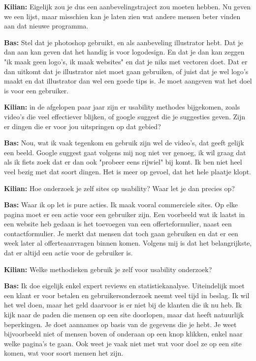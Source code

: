 \textbf{Kilian:} Eigelijk zou je dus een aanbevelingstraject zou moeten hebben. Nu geven we een lijst, maar misschien kan je laten zien wat andere mensen beter vinden aan dat nieuwe programma.

\textbf{Bas:} Stel dat je photoshop gebruikt, en als aanbeveling illustrator hebt. Dat je dan aan kan geven dat het handig is voor logodesign. En dat je dan kan zeggen "ik maak geen logo's, ik maak websites" en dat je niks met vectoren doet. Dat er dan uitkomt dat je illustrator niet moet gaan gebruiken, of juist dat je wel logo's maakt en dat illustrator dan wel een goede tips is. Je moet aangeven wat het doel is voor een gebruiker.

\textbf{Kilian:} in de afgelopen paar jaar zijn er usability methodes bijgekomen, zoals video's die veel effectiever blijken, of google suggest die je suggesties geven. Zijn er dingen die er voor jou uitspringen op dat gebied?

\textbf{Bas:} Nou, wat ik vaak tegenkom en gebruik zijn wel de video's, dat geeft gelijk een beeld. Google suggest gaat volgens mij nog niet ver genoeg, ik wil graag dat als ik fiets zoek dat er dan ook "probeer eens rijwiel" bij komt. Ik ben niet heel veel bezig met dat soort dingen. Het is meer op gevoel, dat het hele plaatje klopt.

\textbf{Kilian:} Hoe onderzoek je zelf sites op usability? Waar let je dan precies op?

\textbf{Bas:} Waar ik op let is pure acties. Ik maak vooral commerciele sites. Op elke pagina moet er een actie voor een gebruiker zijn. Een voorbeeld wat ik laatst in een website heb gedaan is het toevoegen van een offerteformulier, naast een contactformulier. Je merkt dat mensen dat toch gaan gebruiken en dat er een week later al offerteaanvragen binnen komen. Volgens mij is dat het belangrijkste, dat er altijd een actie voor de gebruiker is.

\textbf{Kilian:} Welke methodieken gebruik je zelf voor usability onderzoek?

\textbf{Bas:} Ik doe eigelijk enkel expert reviews en statistiekanalyse. Uiteindelijk moet een klant er voor betalen en gebruikersonderzoek neemt veel tijd in beslag. Ik wil het wel doen, maar het geld daarvoor is er niet bij de klanten die ik nu heb. Ik kijk naar de paden die mensen op een site doorlopen, maar dat heeft natuurlijk beperkingen. Je doet aannames op basis van de gegevens die je hebt. Je weet bijvoorbeeld niet of mensen boven of onderaan op een knop klikken, enkel naar welke pagina's te gaan. Ook weet je vaak niet met wat voor doel ze op een site komen, wat voor soort mensen het zijn.

